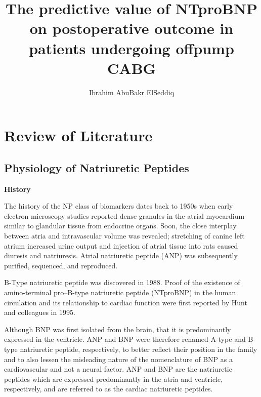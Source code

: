 \documentclass[14pt,a4paper,onecolumn]{extarticle}
\author{Ibrahim AbuBakr ElSeddiq}
\title{The predictive value of NTproBNP on postoperative outcome in patients undergoing offpump CABG}
\begin{document}
\maketitle

\clearpage
\section{Review of Literature}
\subsection{Physiology of Natriuretic Peptides}

\textbf{History}


The history of the NP class of biomarkers dates back to 1950s when early electron microscopy studies reported dense granules in the atrial myocardium similar to glandular tissue from endocrine organs. Soon, the close interplay between atria and intravascular volume was revealed; stretching of canine left atrium increased urine output and injection of atrial tissue into rats caused diuresis and natriuresis. Atrial natriuretic peptide (ANP) was subsequently purified, sequenced, and reproduced. \citep{Gaggin2014} %

B-Type natriuretic peptide was discovered in 1988. Proof of the existence of amino-terminal pro–B-type natriuretic peptide (NTproBNP) in the human circulation and its relationship to cardiac function were first reported by Hunt and colleagues in 1995. \citep{Richards2018} %

Although BNP was first isolated from the brain, that it is predominantly expressed in the ventricle. ANP and BNP were therefore renamed A-type and B-type natriuretic peptide, respectively, to better reflect their position in the family and to also lessen the misleading nature of the nomenclature of BNP as a cardiovascular and not a neural factor. ANP and BNP are the natriuretic peptides which are expressed predominantly in the atria and ventricle, respectively, and are referred to as the cardiac natriuretic peptides. \citep{Suzuki2001}
\end{document}
